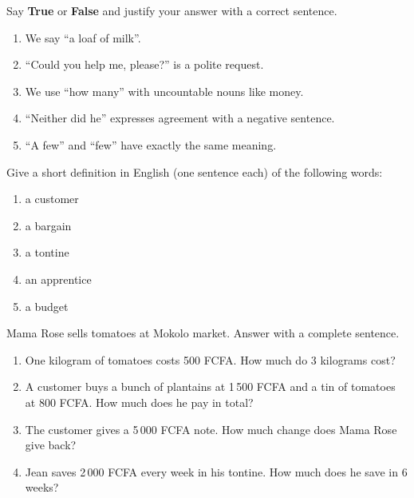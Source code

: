 \documentclass[11pt]{article}
\newcounter{popsec}
\newcounter{popsub}
\newcommand{\courssub}[1]{%
  \stepcounter{popsub}%
  \par\vspace{9pt}\noindent{\popxbold\fontsize{11.5}{13}\selectfont\color{popink}{\color{poporange}\thepopsec.\thepopsub}\hspace{6pt}#1}\par\nopagebreak\vspace{4pt}
}
\begin{document}
\begin{exercice}
Say \textbf{True} or \textbf{False} and justify your answer with a correct sentence.
\begin{enumerate}
\item We say ``a loaf of milk''.
\item ``Could you help me, please?'' is a polite request.
\item We use ``how many'' with uncountable nouns like money.
\item ``Neither did he'' expresses agreement with a negative sentence.
\item ``A few'' and ``few'' have exactly the same meaning.
\end{enumerate}
\end{exercice}

\begin{exercice}[Definitions]
Give a short definition in English (one sentence each) of the following words:
\begin{enumerate}
\item a customer
\item a bargain
\item a tontine
\item an apprentice
\item a budget
\end{enumerate}
\end{exercice}

\begin{exercice}
Mama Rose sells tomatoes at Mokolo market. Answer with a complete sentence.
\begin{enumerate}
\item One kilogram of tomatoes costs 500 FCFA. How much do 3 kilograms cost?
\item A customer buys a bunch of plantains at 1\,500 FCFA and a tin of tomatoes at 800 FCFA. How much does he pay in total?
\item The customer gives a 5\,000 FCFA note. How much change does Mama Rose give back?
\item Jean saves 2\,000 FCFA every week in his tontine. How much does he save in 6 weeks?
\end{enumerate}
\end{exercice}

\courssub{Je m'entraîne}
\end{document}
